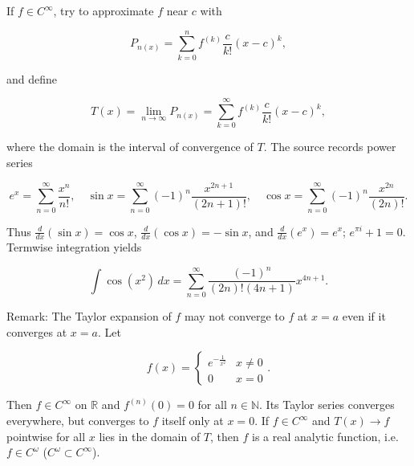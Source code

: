\begin{example}

If \(f \in C^{\infty}\), try to approximate \(f\) near \(c\) with

\[P_{n{(x)}} = \sum\limits_{k = 0}^{n}f^{(k)}\frac{c}{k!}\left( {x - c} \right)^{k},\]

and define

\[T(x) = \lim\limits_{n\rightarrow\infty}P_{n{(x)}} = \sum\limits_{k = 0}^{\infty}f^{(k)}\frac{c}{k!}\left( {x - c} \right)^{k},\]

where the domain is the interval of convergence of \(T\). The source records power series

\[e^{x} = \sum\limits_{n = 0}^{\infty}\frac{x^{n}}{n!},\quad\sin x = \sum\limits_{n = 0}^{\infty}\left( {- 1} \right)^{n}\frac{x^{2n + 1}}{\left( {2n + 1} \right)!},\quad\cos x = \sum\limits_{n = 0}^{\infty}\left( {- 1} \right)^{n}\frac{x^{2n}}{\left( {2n} \right)!}.\]

Thus \(\frac{d}{dx}\left( {\sin x} \right) = \cos x\), \(\frac{d}{dx}\left( {\cos x} \right) = - \sin x\), and \(\frac{d}{dx}\left( e^{x} \right) = e^{x}\); \(e^{\pi i} + 1 = 0\). Termwise integration yields

\[\int\cos\left( x^{2} \right)\, dx = \sum\limits_{n = 0}^{\infty}\frac{\left( {- 1} \right)^{n}}{\left( {2n} \right)!\left( {4n + 1} \right)}x^{4n + 1}.\]

Remark: The Taylor expansion of \(f\) may not converge to \(f\) at \(x = a\) even if it converges at \(x = a\). Let

\[f(x) = \left\{ \begin{matrix}
e^{- \frac{1}{x^{2}}} & {x \neq 0} \\
0 & {x = 0}
\end{matrix} \right..\]

Then \(f \in C^{\infty}\) on \(\mathbb{R}\) and \(f^{(n)}(0) = 0\) for all \(n \in \mathbb{N}\). Its Taylor series converges everywhere, but converges to \(f\) itself only at \(x = 0\). If \(f \in C^{\infty}\) and \(T(x)\rightarrow f\) pointwise for all \(x\) lies in the domain of \(T\), then \(f\) is a real analytic function, i.e. \(f \in C^{\omega}\) (\(C^{\omega} \subset C^{\infty}\)).

\end{example}
